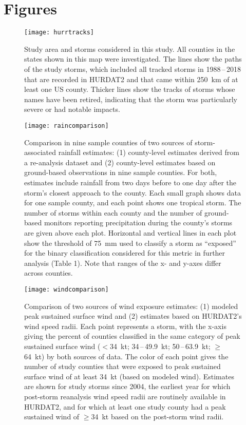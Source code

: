 \section*{Figures}

\listoffigures

\clearpage

\begin{figure}[tbhp!] \centering
\texttt{[image: hurrtracks]}
\caption{Study area and storms considered in this study. All counties in the states
	shown in this map were investigated. The lines show the paths of the
	study storms, which included all tracked storms in 1988\,--\,2018 that
	are recorded in \ac{HURDAT2} and that came
	within 250~\si{\kilo\metre} of at least one \ac{US} county. Thicker
	lines show the tracks of storms whose names have been retired,
	indicating that the storm was particularly severe or had notable
	impacts.  }
\label{fig:hurrtracks}
\end{figure}

\clearpage

\begin{figure}[tbhp!] \centering
\texttt{[image: raincomparison]} 
	\caption{Comparison in nine sample counties of two sources of storm-associated 
	rainfall estimates: (1) county-level estimates derived from 
	a re-analysis dataset and (2) county-level estimates based on ground-based
	observations in nine sample counties. For both, estimates  
	include rainfall from two days before to one day after the storm's closest
	approach to the county. Each small graph shows data for one sample county, 
	and each point shows one tropical storm. The number of storms 
	within each county and the number of ground-based monitors reporting precipitation during 
	the county's storms are given above each plot. Horizontal and vertical lines 
	in each plot show the threshold of 75~\si{\milli\metre} used to classify a storm 
	as ``exposed'' for the binary classification considered for this metric 
	in further analysis (Table 1). Note that 
	ranges of the x- and y-axes differ across counties.
	} 
\label{fig:raincomparison}
\end{figure}

\begin{figure}[tbhp!]
\centering
\texttt{[image: windcomparison]}
	\caption{Comparison of two sources of wind exposure estimates: 
	(1) modeled peak sustained surface wind 
	and (2) estimates based on \ac{HURDAT2}'s wind speed radii.
	Each point represents a storm, with the x-axis giving the percent of
	counties classified in the same category of peak sustained surface
	wind ($<$34~kt; 34\,--\,49.9~kt;
	50\,--\,63.9~kt; $\ge$64~kt) by both sources of 
	data. The color of each point gives the number of study counties that were exposed to
	peak sustained surface wind of at least 34~kt (based
	on modeled wind). Estimates are shown for study storms since
	2004, the earliest year for which post-storm reanalysis wind speed
	radii are routinely available in \ac{HURDAT2}, and for which at
	least one study county had a peak sustained wind of $\ge$34~kt
	based on the post-storm wind radii.
	}
\label{fig:windcomparison}
\end{figure}

